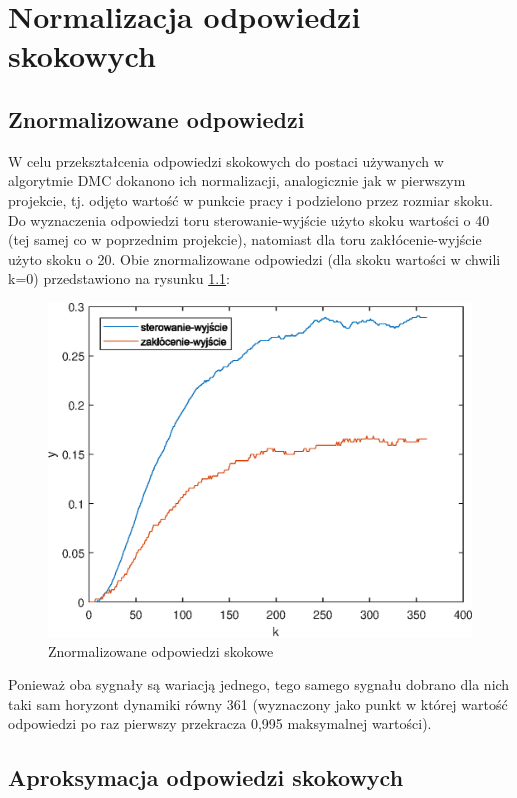 \chapter {Normalizacja odpowiedzi skokowych}

\section{Znormalizowane odpowiedzi}

W celu przekształcenia odpowiedzi skokowych do postaci używanych w algorytmie DMC dokanono ich normalizacji, analogicznie jak w pierwszym projekcie, tj. odjęto wartość w punkcie pracy i podzielono przez rozmiar skoku. Do wyznaczenia odpowiedzi toru sterowanie-wyjście użyto skoku wartości o 40 (tej samej co w poprzednim projekcie), natomiast dla toru zakłócenie-wyjście użyto skoku o 20. Obie znormalizowane odpowiedzi (dla skoku wartości w chwili k=0)  przedstawiono na rysunku \ref{normal_odp}:


\begin{figure}[h!]
	\centering
	\includegraphics[scale=1]{Rys/LAB2_NormalStepResponses_Z3.eps}
	\caption{Znormalizowane odpowiedzi skokowe}
	\label{normal_odp}
\end{figure}


Ponieważ oba sygnały są wariacją jednego, tego samego sygnału dobrano dla nich taki sam horyzont dynamiki równy 361 (wyznaczony jako punkt w której wartość odpowiedzi po raz pierwszy przekracza 0,995 maksymalnej wartości).
\FloatBarrier

\section{Aproksymacja odpowiedzi skokowych}

